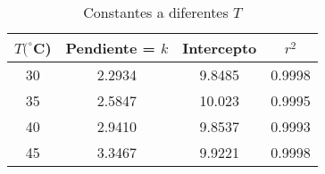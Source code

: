 \begin{table}[H]
    \centering
    \begin{tabular}{cccc}
        \hline
        $ T (^{\circ}$C) & Pendiente = $k$  & Intercepto & $r^{2}$ \\
        \hline

        30 & 2.2934 & 9.8485   & 0.9998  \\
        35 & 2.5847 & 10.023   & 0.9995   \\
        40 & 2.9410 & 9.8537   & 0.9993   \\
        45 & 3.3467 & 9.9221   & 0.9998   \\
        \hline

    \end{tabular} 
    \caption{Constantes a diferentes $T$}
    \label{fig:Constantes_a_dif_T}
\end{table}